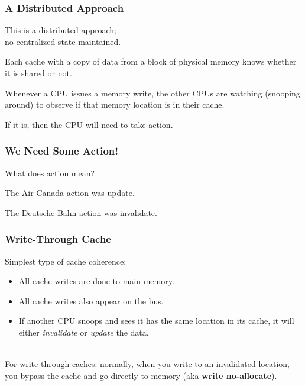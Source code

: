 \begin{frame}
\frametitle{A Distributed Approach}

\Large

This is a distributed approach; \\
no centralized state maintained. 

Each cache with a copy of data from a block of physical memory knows whether it is shared or not. 

Whenever a CPU issues a memory write, the other CPUs are watching (snooping around) to observe if that memory location is in their cache. 

If it is, then the CPU will need to take action.

\end{frame}


\begin{frame}
\frametitle{We Need Some Action!}
\Large

What does action mean?

The Air Canada action was \alert{update}.

The Deutsche Bahn action was \alert{invalidate}.

\end{frame}


\begin{frame}
  \frametitle{Write-Through Cache}
\Large
  
Simplest type of cache coherence:
  \begin{itemize}
    \item All cache writes are done to main memory.
    \item All cache writes also appear on the bus.
    \item If another CPU snoops and sees it has the same location in
      its cache, it will either {\it invalidate} or {\it update} the
      data.
\end{itemize}
~\\

    For write-through caches: normally, when you write to an invalidated
    location, you bypass the cache and go directly to memory (aka {\bf
      write no-allocate}).

  
\end{frame}


